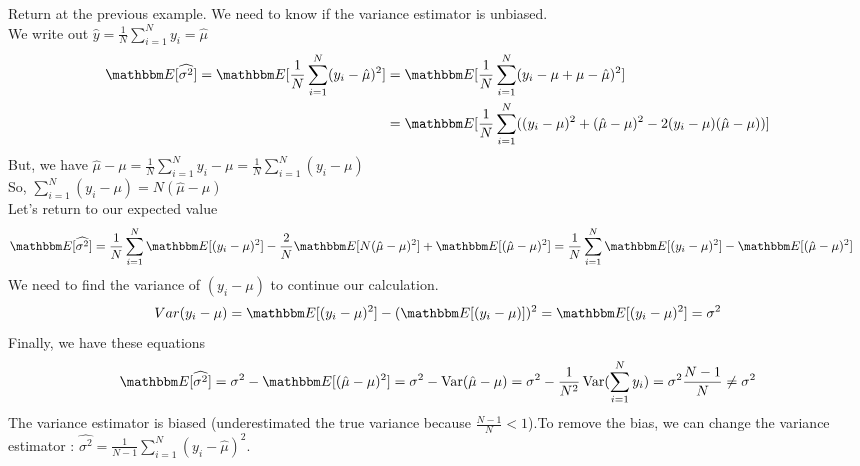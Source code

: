 \documentclass{article}
\begin{document}
\begin{exemple}
Return at the previous example. We need to know if the variance estimator is unbiased.\\
We write out $\hat{y} = \frac{1}{N} \sum_{i=1}^N y_i = \hat{\mu}$
\begin{equation*}
\begin{split}
   \esp[\widehat{\sigma^2}] = \esp[\frac{1}{N} \sum_{i=1}^N(y_i-\hat{\mu})^2] 
   &= \esp[\frac{1}{N} \sum_{i=1}^N(y_i-\mu + \mu - \hat{\mu})^2]\\
   &= \esp[\frac{1}{N} \sum_{i=1}^N((y_i-\mu)^2 + (\hat{\mu}-\mu)^2 - 2(y_i-\mu)(\hat{\mu}-\mu))]
   \end{split}
\end{equation*}
But, we have $\hat{\mu}-\mu = \frac{1}{N}\sum_{i=1}^N y_i-\mu = \frac{1}{N}\sum_{i=1}^N(y_i-\mu)$ \\
So, $\sum_{i=1}^N(y_i-\mu) = N(\hat{\mu}-\mu)$\\
Let's return to our expected value
\begin{equation*}
    \begin{split}
        \esp[\widehat{\sigma^2}] = \frac{1}{N} \sum_{i=1}^N \esp[(y_i-\mu)^2]-\frac{2}{N}\esp[N(\hat{\mu}-\mu)^2]+\esp[(\hat{\mu}-\mu)^2] 
        &=  \frac{1}{N} \sum_{i=1}^N\esp[(y_i-\mu)^2]-\esp[(\hat{\mu}-\mu)^2]
    \end{split}
\end{equation*}
We need to find the variance of $(y_i-\mu)$ to continue our calculation.
\[\\Var(y_i-\mu) = \esp[(y_i-\mu)^2]-(\esp[(y_i-\mu)])^2 = \esp[(y_i-\mu)^2] = \sigma^2\]
Finally, we have these equations
\begin{equation*}
    \esp[\widehat{\sigma^2}] = \sigma^2 - \esp[(\hat{\mu}-\mu)^2] = \sigma^2 - \Var(\hat{\mu}-\mu) = \sigma^2 - \frac{1}{N^2}\Var(\sum_{i=1}^N y_i) = \sigma^2\frac{N-1}{N} \ne \sigma^2
\end{equation*}
The variance estimator is biased (underestimated the true variance because $\frac{N-1}{N}<1$).To remove the bias, we can change the variance estimator : $\widehat{\sigma^2} = \frac{1}{N-1}\sum_{i=1}^N (y_i-\hat{\mu})^2$.
\end{exemple}
\end{document}
